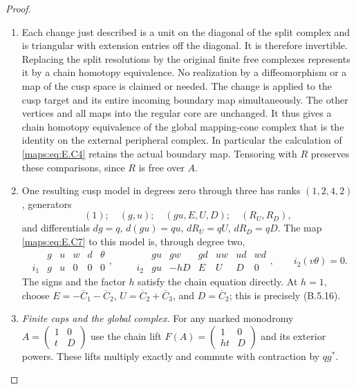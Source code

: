 \begin{proof}
\begin{enumerate}[label=\arabic*.,leftmargin=*]
\item Each change just described is a unit on the diagonal
of the split complex and is triangular with extension
entries off the diagonal. It is therefore invertible.
Replacing the split resolutions by the original finite
free complexes represents it by a chain homotopy
equivalence. No realization by a diffeomorphism or a
map of the cusp space is claimed or needed. The change
is applied to the cusp target and its entire incoming
boundary map simultaneously. The other vertices and
all maps into the regular core are unchanged. It thus
gives a chain homotopy equivalence of the global
mapping-cone complex that is the identity on the
external peripheral complex. In particular the
calculation of \eqref{maps:eq:E.C4} retains the actual boundary
map. Tensoring with $R$ preserves these comparisons,
since $R$ is free over $A$.

\item One resulting cusp model in degrees zero through three
has ranks $(1,2,4,2)$, generators
\[
 (1);\quad(g,u);\quad(gu,E,U,D);\quad(R_U,R_D),
\]
and differentials $dg=q$, $d(gu)=qu$,
$dR_U=qU$, $dR_D=qD$. The map \eqref{maps:eq:E.C7} to this model
is, through degree two,
\[
 \begin{array}{c|ccccc}
  &g&u&w&d&\theta\\ \hline
  i_1&g&u&0&0&0
 \end{array},\qquad
 \begin{array}{c|rrrrrr}
  &gu&gw&gd&uw&ud&wd\\ \hline
  i_2&gu&-hD&E&U&D&0
 \end{array},
 \qquad i_2(v\theta)=0.
 \tag{E.C12}\label{maps:eq:E.C12}
\]
The signs and the factor $h$ satisfy the chain equation
directly. At $h=1$, choose
$E=-\overline C_1-\overline C_2$,
$U=\overline C_2+\overline C_3$, and
$D=\overline C_2$; this is precisely (B.5.16).

\item \emph{Finite caps and the global complex.}
For any marked monodromy
$A=\left(\begin{smallmatrix}1&0\\t&D\end{smallmatrix}\right)$
use the chain lift
$F(A)=\left(\begin{smallmatrix}1&0\\ht&D\end{smallmatrix}\right)$
and its exterior powers. These lifts multiply exactly
and commute with contraction by $qg^*$.


\end{enumerate}
\end{proof}
